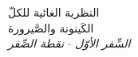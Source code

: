 \documentclass[10pt, openany, oneside]{book}
\renewcommand{\normalsize}{\fontsize{10}{13}\selectfont}
\begin{document}

\thispagestyle{empty}
\vspace*{\fill}
\begin{center}
    {\normalsize النظرية الغائية للكلّ}\\[1.5em]
    {\fontsize{24}{28}\selectfont الكَينونة والصَّيرورة}\\[0.8em]
    {\normalsize\itshape السِّفر الأوّل $\cdot$ نقطة الصِّفر}
\end{center}
\vspace*{\fill}
\newpage

\end{document}
